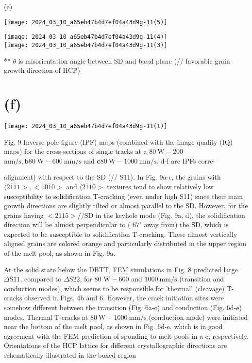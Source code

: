 \documentclass[10pt]{article}
\begin{document}
(e)

\begin{center}
\texttt{[image: 2024\_03\_10\_a65eb47b4d7ef04a43d9g-11(5)]}
\end{center}

\texttt{[image: 2024\_03\_10\_a65eb47b4d7ef04a43d9g-11(4)]}\\
\texttt{[image: 2024\_03\_10\_a65eb47b4d7ef04a43d9g-11(3)]}

** $\theta$ is misorientation angle between $\mathrm{SD}$ and basal plane (// favorable grain growth direction of HCP)

\section*{(f)}
\begin{center}
\texttt{[image: 2024\_03\_10\_a65eb47b4d7ef04a43d9g-11(1)]}
\end{center}

Fig. 9 Inverse pole figure (IPF) maps (combined with the image quality (IQ) maps) for the cross-sections of single tracks at a $80 \mathrm{~W}-200$ $\mathrm{mm} / \mathrm{s}, \mathbf{b} 80 \mathrm{~W}-600 \mathrm{~mm} / \mathrm{s}$ and $\mathbf{c} 80 \mathrm{~W}-1000 \mathrm{~mm} / \mathrm{s}$. d-f are IPFs corre-

alignment) with respect to the SD (// S11). In Fig. 9a-c, the grains with $\langle 2 \overline{1} \overline{1} 1>,<10 \overline{1} 0>$ and $\langle 2 \overline{1} \overline{1} 0>$ textures tend to show relatively low susceptibility to solidification T-cracking (even under high S11) since their main growth directions are slightly tilted or almost parallel to the SD. However, for the grains having $<2 \overline{1} \overline{1} 5>/ / \mathrm{SD}$ in the keyhole mode (Fig. 9a, d), the solidification direction will be almost perpendicular to ( $67^{\circ}$ away from) the $\mathrm{SD}$, which is expected to be susceptible to solidification T-cracking. These almost vertically aligned grains are colored orange and particularly distributed in the upper region of the melt pool, as shown in Fig. 9a.

At the solid state below the DBTT, FEM simulations in Fig. 8 predicted large $\Delta \mathrm{S} 11$, compared to $\Delta \mathrm{S} 22$, for 80 $\mathrm{W}-600$ and $1000 \mathrm{~mm} / \mathrm{s}$ (transition and conduction modes), which seems to be responsible for 'thermal' (cleavage) T-cracks observed in Figs. 4b and 6. However, the crack initiation sites were somehow different between the transition (Fig. 6a-c) and conduction (Fig. 6d-e) modes. Thermal T-cracks at $80 \mathrm{~W}-1000 \mathrm{~mm} / \mathrm{s}$ (conduction mode) were initiated near the bottom of the melt pool, as shown in Fig. 6d-e, which is in good agreement with the FEM prediction of sponding to melt pools in a-c, respectively. Orientations of the HCP lattice for different crystallographic directions are schematically illustrated in the boxed region
\end{document}
